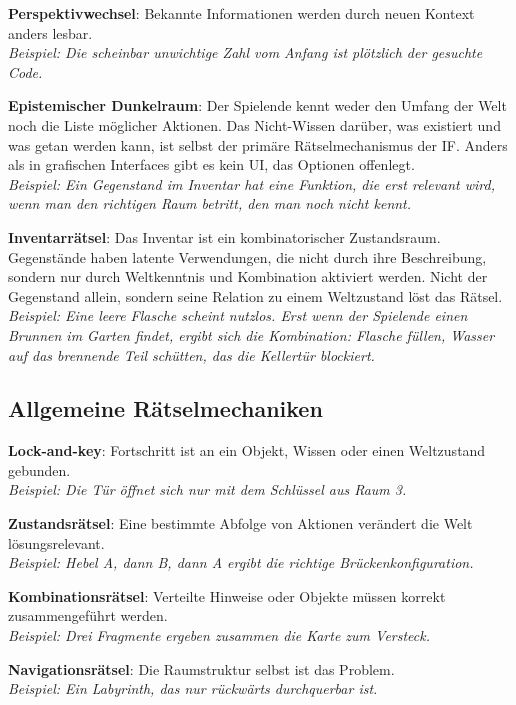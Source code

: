 \documentclass[parskip=half,a4paper,11pt]{scrreprt}
\begin{document}
\textbf{Perspektivwechsel}: Bekannte Informationen werden durch neuen Kontext anders lesbar. \\
\textit{Beispiel: Die scheinbar unwichtige Zahl vom Anfang ist plötzlich der gesuchte Code.}

\textbf{Epistemischer Dunkelraum}: Der Spielende kennt weder den Umfang der Welt noch die Liste möglicher Aktionen. Das Nicht-Wissen darüber, was existiert und was getan werden kann, ist selbst der primäre Rätselmechanismus der IF. Anders als in grafischen Interfaces gibt es kein UI, das Optionen offenlegt. \\
\textit{Beispiel: Ein Gegenstand im Inventar hat eine Funktion, die erst relevant wird, wenn man den richtigen Raum betritt, den man noch nicht kennt.}

\textbf{Inventarrätsel}: Das Inventar ist ein kombinatorischer Zustandsraum. Gegenstände haben latente Verwendungen, die nicht durch ihre Beschreibung, sondern nur durch Weltkenntnis und Kombination aktiviert werden. Nicht der Gegenstand allein, sondern seine Relation zu einem Weltzustand löst das Rätsel. \\
\textit{Beispiel: Eine leere Flasche scheint nutzlos. Erst wenn der Spielende einen Brunnen im Garten findet, ergibt sich die Kombination: Flasche füllen, Wasser auf das brennende Teil schütten, das die Kellertür blockiert.}

\subsection{Allgemeine Rätselmechaniken}

\textbf{Lock-and-key}: Fortschritt ist an ein Objekt, Wissen oder einen Weltzustand gebunden. \\
\textit{Beispiel: Die Tür öffnet sich nur mit dem Schlüssel aus Raum 3.}

\textbf{Zustandsrätsel}: Eine bestimmte Abfolge von Aktionen verändert die Welt lösungsrelevant. \\
\textit{Beispiel: Hebel A, dann B, dann A ergibt die richtige Brückenkonfiguration.}

\textbf{Kombinationsrätsel}: Verteilte Hinweise oder Objekte müssen korrekt zusammengeführt werden. \\
\textit{Beispiel: Drei Fragmente ergeben zusammen die Karte zum Versteck.}

\textbf{Navigationsrätsel}: Die Raumstruktur selbst ist das Problem. \\
\textit{Beispiel: Ein Labyrinth, das nur rückwärts durchquerbar ist.}
\end{document}
